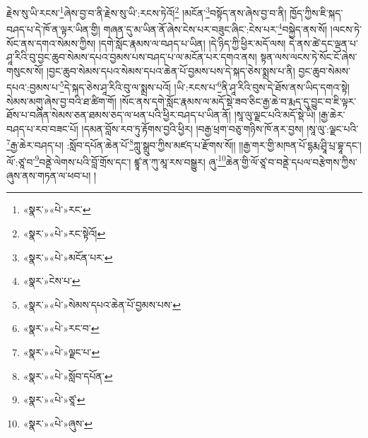 རྗེས་སུ་ཡི་རངས་\footnote{«སྣར་»«པེ་»རང་}ཞེས་བྱ་བ་ནི་རྗེས་སུ་ཡི་:རངས་ཏེའོ།\footnote{«སྣར་»«པེ་»རང་སྟེའོ།} །མངོན་\footnote{«སྣར་»«པེ་»མངོན་པར་}བསྟོད་ནས་ཞེས་བྱ་བ་ནི། ཁྱོད་ཀྱིས་ཇི་སྐད་བཤད་པ་དེ་ཁོ་ན་ལྟར་ཡིན་གྱི། གཞན་དུ་མ་ཡིན་ནོ་ཞེས་ངེས་པར་བཟུང་ཞིང་:ངེས་པར་\footnote{«སྣར་»ངེས་པ་}བསྐྱེད་ནས་སོ། །ལངས་ཏེ་སོང་ནས་དགའ་སེམས་ཀྱིས། །དགེ་སློང་རྣམས་ལ་བཤད་པ་ཡིན། །དེ་ཉིད་ཀྱི་ཕྱིར་མདོ་ལས། དེ་ནས་ཚེ་དང་ལྡན་པ་ཤཱ་རིའི་བུ་བྱང་ཆུབ་སེམས་དཔའ་བྱམས་པས་བཤད་པ་ལ་མངོན་པར་དགའ་ནས། སྟན་ལས་ལངས་ཏེ་སོང་ངོ་ཞེས་གསུངས་སོ། །བྱང་ཆུབ་སེམས་དཔའ་སེམས་དཔའ་ཆེན་པོ་བྱམས་པས་དེ་སྐད་ཅེས་སྨྲས་པ་ནི། བྱང་ཆུབ་སེམས་དཔའ་:བྱམས་པ་\footnote{«སྣར་»«པེ་»སེམས་དཔའ་ཆེན་པོ་བྱམས་པས་}དེ་སྐད་ཅེས་ཤཱ་རིའི་བུ་ལ་སྨྲས་པའོ། །ཡི་:རངས་པ་\footnote{«སྣར་»«པེ་»རང་བ་}ནི་ཤཱ་རིའི་བུས་དེ་ཐོས་ནས་ཡིད་དགའ་སྟེ། སེམས་མགུ་ཞེས་བྱ་བའི་ཐ་ཚིག་གོ། །སོང་ནས་དགེ་སློང་རྣམས་ལ་མདོ་སྡེ་ཟབ་ཅིང་རྒྱ་ཆེ་བ་རྨད་དུ་བྱུང་བ་ཇི་ལྟར་ཐོས་པ་བཞིན་སེམས་ཅན་ཐམས་ཅད་ལ་ཕན་པའི་ཕྱིར་བཤད་པ་ཡིན་ནོ། །སཱ་ལུ་ལྗང་པའི་མདོ་སྡེ་ཡི། །རྒྱ་ཆེར་བཤད་པ་རབ་བཟང་པོ། །དམན་བློས་རབ་ཏུ་རྟོགས་བྱའི་ཕྱིར། །བརྒྱ་ཕྲག་བཅུ་གཉིས་ཁོ་ནར་བྱས། །སཱ་ལུ་:ལྗང་པའི་\footnote{«སྣར་»«པེ་»ལྗང་པ་}རྒྱ་ཆེར་བཤད་པ། :སློབ་དཔོན་ཆེན་པོ་\footnote{«སྣར་»«པེ་»སློབ་དཔོན་}ཀླུ་སྒྲུབ་ཀྱིས་མཛད་པ་རྫོགས་སོ།། །།རྒྱ་གར་གྱི་མཁན་པོ་དྷརྨ་ཤྲཱི་པྲ་བྷཱ་དང་། ལོ་:ཙཱ་བ་\footnote{«སྣར་»«པེ་»ཙཱ་}བནྡེ་ལེགས་པའི་བློ་གྲོས་དང་། ཛྙཱ་ན་ཀུ་མཱ་རས་བསྒྱུར། ཞུ་\footnote{«སྣར་»«པེ་»ཞུས་}ཆེན་གྱི་ལོ་ཙཱ་བ་བནྡེ་དཔལ་བརྩེགས་ཀྱིས་ཞུས་ནས་གཏན་ལ་ཕབ་པ། ། 
